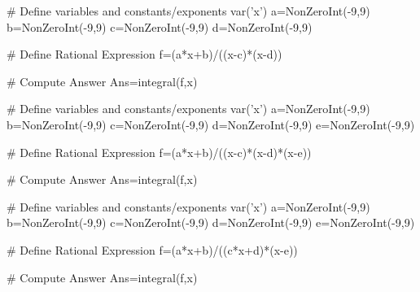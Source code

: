 \begin{sagesilent}
# Define variables and constants/exponents
var('x')
a=NonZeroInt(-9,9)
b=NonZeroInt(-9,9)
c=NonZeroInt(-9,9)
d=NonZeroInt(-9,9)


# Define Rational Expression
f=(a*x+b)/((x-c)*(x-d))

# Compute Answer
Ans=integral(f,x)
\end{sagesilent}



\begin{sagesilent}
# Define variables and constants/exponents
var('x')
a=NonZeroInt(-9,9)
b=NonZeroInt(-9,9)
c=NonZeroInt(-9,9)
d=NonZeroInt(-9,9)
e=NonZeroInt(-9,9)


# Define Rational Expression
f=(a*x+b)/((x-c)*(x-d)*(x-e))

# Compute Answer
Ans=integral(f,x)
\end{sagesilent}


\begin{sagesilent}
# Define variables and constants/exponents
var('x')
a=NonZeroInt(-9,9)
b=NonZeroInt(-9,9)
c=NonZeroInt(-9,9)
d=NonZeroInt(-9,9)
e=NonZeroInt(-9,9)


# Define Rational Expression
f=(a*x+b)/((c*x+d)*(x-e))

# Compute Answer
Ans=integral(f,x)
\end{sagesilent}

